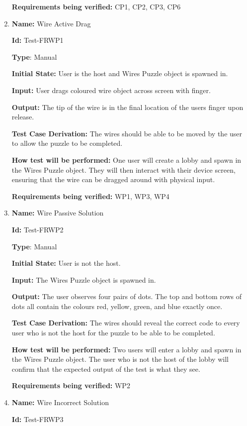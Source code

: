 \documentclass[12pt, titlepage]{article}
\begin{document}
\begin{enumerate}
\textbf{Requirements being verified: } CP1, CP2, CP3, CP6

\item{\textbf{Name:} Wire Active Drag} \label{itm:Test-FRWP1}

\textbf{Id:} Test-FRWP1

\textbf{Type}: Manual

\textbf{Initial State:} User is the host and Wires Puzzle object is spawned in.

\textbf{Input:} User drags coloured wire object across screen with finger. 

\textbf{Output:} The tip of the wire is in the final location of the users finger upon release.

\textbf{Test Case Derivation:} The wires should be able to be moved by the user to allow the puzzle to be completed. 

\textbf{How test will be performed:} One user will create a lobby and spawn in the Wires Puzzle object. They will then interact with their device screen, ensuring that the wire can be dragged around with physical input. 

\textbf{Requirements being verified: } WP1, WP3, WP4

\item{\textbf{Name:} Wire Passive Solution} \label{itm:Test-FRWP2}

\textbf{Id:} Test-FRWP2

\textbf{Type}: Manual

\textbf{Initial State:} User is not the host.

\textbf{Input:} The Wires Puzzle object is spawned in.

\textbf{Output:} The user observes four pairs of dots. The top and bottom rows of dots all contain the colours red, yellow, green, and blue exactly once. 

\textbf{Test Case Derivation:} The wires should reveal the correct code to every user who is not the host for the puzzle to be able to be completed. 

\textbf{How test will be performed:} Two users will enter a lobby and spawn in the Wires Puzzle object. The user who is not the host of the lobby will confirm that the expected output of the test is what they see.

\textbf{Requirements being verified: } WP2

\item{\textbf{Name:} Wire Incorrect Solution} \label{itm:Test-FRWP3}

\textbf{Id:} Test-FRWP3


\end{enumerate}
\end{document}
